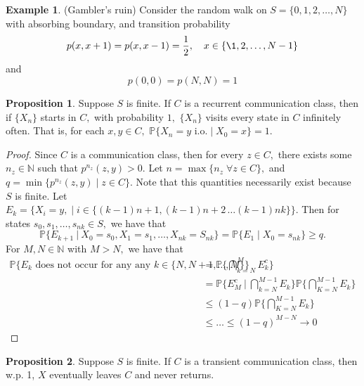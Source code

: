 \documentclass[10pt, oneside]{article}
\newcommand{\bbP}{\mathbb{P}}
\newcommand{\bbN}{\mathbb{N}}
\theoremstyle{definition}
\newtheorem{exmp}{Example}[section]
\newtheorem{prop}{Proposition}
\begin{document}
\begin{exmp} (Gambler's ruin)
    Consider the random walk on $S = \{0,1,2, \dots, N\}$ with absorbing boundary, and transition probability
    \[p(x,x+1) = p(x, x-1) = \frac{1}{2}, \quad x\in \{\1,2,\dots, N-1\}\] and 
    \[p(0,0) = p(N,N) = 1\]
\end{exmp}

\begin{prop}
    Suppose $S$ is finite. If $C$ is a recurrent communication class, then if $\{X_n\}$ starts in $C,$ with probability $1,$ $\{X_n\}$ visits every state in $C$ infinitely often. That is, for each $x,y \in C,$ $\bbP\{X_n = y \text{ i.o.} \; | \; X_0 = x\} = 1.$
\end{prop}
\begin{proof}
    Since $C$ is a communication class, then for every $z \in C,$ there exists some $n_z \in \bbN$ such that $p^{n_z}(z,y) >0.$ Let $n = \max\{n_z\; \forall z \in C\},$ and $q = \min\{p^{n_z}(z,y)\; | \; z\in C\}.$ Note that this quantities necessarily exist because $S$ is finite. Let $E_k = \{X_i = y, \; | \; i \in \{(k-1)n + 1, (k-1)n + 2\, \dots (k-1)nk\}\}.$ Then for states $s_0, s_1, \dots, s_{nk} \in S,$ we have that 
    \[\bbP\{E_{k+1} \: | \: X_0 = s_0, X_1 = s_1, \dots, X_{nk} = S_{nk}\} = \bbP\{E_1 \; | \; X_0 = s_{nk}\} \geq q.\] For $M, N \in \bbN$ with $M > N,$ we have that 
    \begin{align*}
      \bbP\{E_k \text{ does not occur for any any } k \in \{N, N + 1, \dots, M\}\} &= \bbP\{\bigcap_{k=N}^M E_k^c\}  \\
      &= \bbP\{E_M^c \:  | \: \bigcap_{k = N}^{M-1}E_k\}\bbP\{\bigcap_{K=N}^{M-1}E_k\}\\
      &\leq (1-q)\bbP\{\bigcap_{K=N}^{M-1}E_k\} \\
      &\leq\dots\leq (1-q)^{M-N} \to 0
    \end{align*}
\end{proof}
\begin{prop}
    Suppose $S$ is finite. If $C$ is a transient communication class, then w.p. 1, $X$ eventually leaves $C$ and never returns.
\end{prop}
\end{document}
